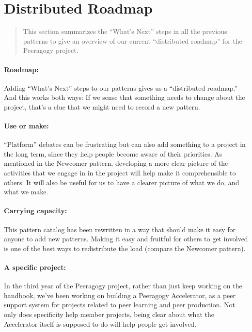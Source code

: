 \section{Distributed Roadmap}

\begin{quote}
This section summarizes the ``What's Next'' steps in all the previous
patterns to give an overview of our current ``distributed roadmap''
for the Peeragogy project.
\end{quote}

\paragraph{Roadmap:} Adding ``What's Next'' steps to our patterns gives us a ``distributed roadmap.''  And this works both ways:  
If we sense that something needs to change about the project, that's a
clue that we might need to record a new pattern.

\paragraph{Use or make:} “Platform” debates can be frustrating but can also add something to a project in the long term, since they help people become aware of their
priorities. As mentioned in the Newcomer pattern, developing a more clear
picture of the activities that we engage in in the project will help
make it comprehensible to others. It will also be useful for us to have
a clearer picture of what we do, and what we make.

\paragraph{Carrying capacity:} This pattern catalog has been rewritten in a way that should make it
easy for anyone to add new patterns. Making it easy and fruitful for
others to get involved is one of the best ways to redistribute the load
(compare the Newcomer pattern).

\paragraph{A specific project:} In the third year of the Peeragogy project, rather than just keep
working on the handbook, we’ve been working on building a Peeragogy
Accelerator, as a peer support system for projects related to peer
learning and peer production. Not only does specificity help member
projects, being clear about what the Accelerator itself is supposed to
do will help people get involved.

